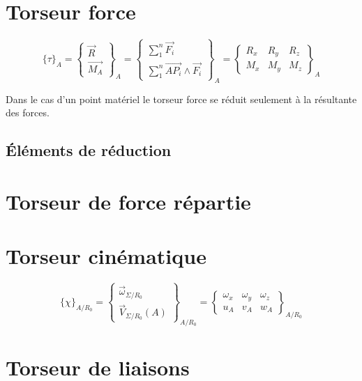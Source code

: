\section{Torseur  force}
\begin{defi}

$$\{\tau\}_{A}=\begin{Bmatrix}\overrightarrow{R}\\\overrightarrow{M_A}\end{Bmatrix}_A=\begin{Bmatrix} \sum_{1}^{n}\overrightarrow{F_i}\\\sum_{1}^{n}\overrightarrow{AP_i}\land\overrightarrow{F_i}\end{Bmatrix}_A=\begin{Bmatrix} R_x & R_y  & R_z\\ M_x & M_y & M_z\end{Bmatrix}_A$$
\end{defi}
\begin{rmq}
Dans le cas d'un point matériel le torseur force se réduit seulement à la résultante des forces.
\end{rmq}
\subsection{Éléments de réduction}
\section{Torseur de force répartie}
\section{Torseur cinématique}
\begin{defi}

$${\lbrace\chi\rbrace}_{A/R_0}=\begin{Bmatrix}\overrightarrow{\omega}_{\Sigma/R_0}\\\overrightarrow{V}_{\Sigma/R_0}(A)\end{Bmatrix}_{A/R_0}=\begin{Bmatrix} \omega_x & \omega_y  & \omega_z\\ u_A & v_A & w_A\end{Bmatrix}_{A/R_0}$$
\end{defi}
\section{Torseur de liaisons}
